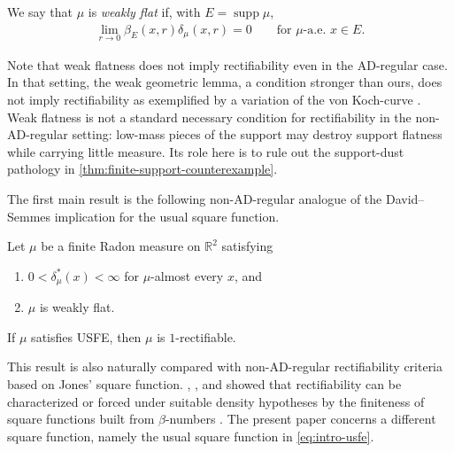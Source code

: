 \documentclass[11pt,a4paper,english,reqno]{amsart}
\numberwithin{equation}{section}
\newcommand{\RR}[0]{\mathbb{R}}
\DeclareMathOperator{\supp}{supp}
\numberwithin{definition}{section}
\begin{document}
\begin{definition}\label{def:weak-flatness}
  We say that $\mu$ is \emph{weakly flat} if, with $E=\supp\mu$,
  \begin{align}\label{eq:intro-weak-flatness}
    \lim_{r\to0}\beta_E(x,r)\delta_\mu(x,r)=0
    \qquad\text{for }\mu\text{-a.e. }x\in E.
  \end{align}
\end{definition}
Note that weak flatness does not imply rectifiability even in the AD-regular case.
In that setting, the weak geometric lemma, a condition stronger than ours, does not imply rectifiability as exemplified by a variation of the von Koch-curve \cite[Section 20]{davidSingularIntegralsRectifiable1991}.
Weak flatness is not a standard necessary condition for rectifiability in the non-AD-regular setting: low-mass pieces of the support may destroy support flatness while carrying little measure.
Its role here is to rule out the support-dust pathology in \cref{thm:finite-support-counterexample}.

The first main result is the following non-AD-regular analogue of the David--Semmes implication for the usual square function.
\begin{theorem}\label{thm:main-theorem}
  Let $\mu$ be a finite Radon measure on $\RR^2$ satisfying
  \begin{enumerate}
    \item \label{item:finite-positive-upper-density} $0<\delta_\mu^*(x)<\infty$ for $\mu$-almost every $x$, and
    \item \label{item:weak-flatness} $\mu$ is weakly flat.
  \end{enumerate}
  If $\mu$ satisfies USFE, then $\mu$ is $1$-rectifiable.
\end{theorem}

This result is also naturally compared with non-AD-regular rectifiability criteria based on Jones' square function.
, \citeauthor{badgerTwoSufficientConditions2015}, and \citeauthor{azzamCharacterizationNrectifiabilityTerms2015} showed that rectifiability can be characterized or forced under suitable density hypotheses by the finiteness of square functions built from $\beta$-numbers \cite{pajotConditionsQuantitativesRectifiabilite1997,badgerTwoSufficientConditions2015,tolsaCharacterizationNrectifiabilityTerms2015,azzamCharacterizationNrectifiabilityTerms2015}.  The present paper concerns a different square function, namely the usual square function in \cref{eq:intro-usfe}.
\end{document}

